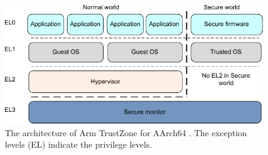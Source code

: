 \begin{figure}[htpb]
  \centering
  \includegraphics[width=0.8\linewidth]{figures/arm-trustzone-arch.pdf}
  \caption{The architecture of Arm TrustZone for AArch64 \cite{TZArch}. The exception levels (EL) indicate the privilege levels.} \label{fig:arm_trustzone_arch}
\end{figure}
